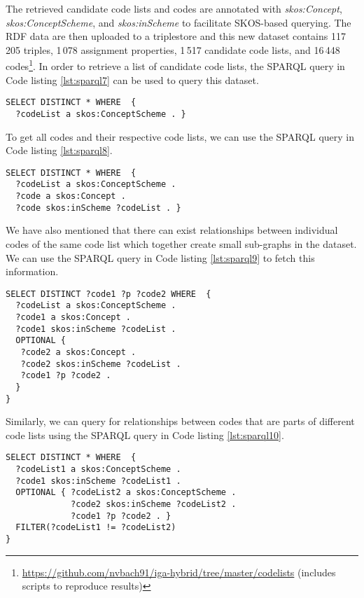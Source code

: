 The retrieved candidate code lists and codes are annotated with \textit{skos:Concept}, \textit{skos:ConceptScheme}, and \textit{skos:inScheme} to facilitate SKOS-based querying. The RDF data are then uploaded to a triplestore and this new dataset contains 117\,205 triples, 1\,078 assignment properties, 1\,517 candidate code lists, and 16\,448 codes\footnote{\url{https://github.com/nvbach91/iga-hybrid/tree/master/codelists} (includes scripts to reproduce results)}. In order to retrieve a list of candidate code lists, the SPARQL query in Code listing \ref{lst:sparql7} can be used to query this dataset.

\begin{lstlisting}[captionpos=b, caption=Query to get a list of code lists,label=lst:sparql7,basicstyle=\small\ttfamily,frame=single]
SELECT DISTINCT * WHERE  {
  ?codeList a skos:ConceptScheme . }
\end{lstlisting}

To get all codes and their respective code lists, we can use the SPARQL query in Code listing \ref{lst:sparql8}.

\begin{lstlisting}[captionpos=b, caption=Query to get all code lists with codes,label=lst:sparql8,basicstyle=\small\ttfamily,frame=single]
SELECT DISTINCT * WHERE  {
  ?codeList a skos:ConceptScheme .
  ?code a skos:Concept .
  ?code skos:inScheme ?codeList . }
\end{lstlisting}

We have also mentioned that there can exist relationships between individual codes of the same code list which together create small sub-graphs in the dataset. We can use the SPARQL query in Code listing \ref{lst:sparql9} to fetch this information.


\begin{lstlisting}[captionpos=b, caption=Query to capture the structures of code lists,label=lst:sparql9,basicstyle=\small\ttfamily,frame=single]
SELECT DISTINCT ?code1 ?p ?code2 WHERE  {
  ?codeList a skos:ConceptScheme .
  ?code1 a skos:Concept .
  ?code1 skos:inScheme ?codeList .
  OPTIONAL {
   ?code2 a skos:Concept .
   ?code2 skos:inScheme ?codeList .
   ?code1 ?p ?code2 .
  }
}
\end{lstlisting}

Similarly, we can query for relationships between codes that are parts of different code lists using the SPARQL query in Code listing \ref{lst:sparql10}.

\begin{lstlisting}[captionpos=b, caption=Query to capture the relationships between members of different code lists,label=lst:sparql10,basicstyle=\small\ttfamily,frame=single]
SELECT DISTINCT * WHERE  {
  ?codeList1 a skos:ConceptScheme .
  ?code1 skos:inScheme ?codeList1 .
  OPTIONAL { ?codeList2 a skos:ConceptScheme .
             ?code2 skos:inScheme ?codeList2 .
             ?code1 ?p ?code2 . }
  FILTER(?codeList1 != ?codeList2)
}
\end{lstlisting}

